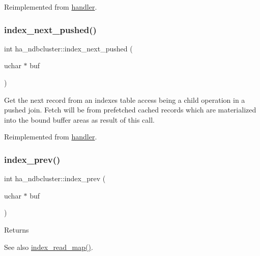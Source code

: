 Reimplemented from \mbox{\hyperlink{classhandler_aca48f687872e10a4fdc35b418d98b761}{handler}}.

\mbox{\label{classha__ndbcluster_a8c12adc1c87097562760e06689e7ec38}} 
\subsubsection{\texorpdfstring{index\+\_\+next\+\_\+pushed()}{index\_next\_pushed()}}
{\footnotesize\ttfamily int ha\+\_\+ndbcluster\+::index\+\_\+next\+\_\+pushed (\begin{DoxyParamCaption}\item[{uchar $\ast$}]{buf }\end{DoxyParamCaption})\hspace{0.3cm}{\ttfamily [virtual]}}

Get the next record from an indexes table access being a child operation in a pushed join. Fetch will be from prefetched cached records which are materialized into the bound buffer areas as result of this call. 

Reimplemented from \mbox{\hyperlink{classhandler}{handler}}.

\mbox{\label{classha__ndbcluster_a824559f84d7f256052f0394e9276774f}} 
\subsubsection{\texorpdfstring{index\+\_\+prev()}{index\_prev()}}
{\footnotesize\ttfamily int ha\+\_\+ndbcluster\+::index\+\_\+prev (\begin{DoxyParamCaption}\item[{uchar $\ast$}]{buf }\end{DoxyParamCaption})\hspace{0.3cm}{\ttfamily [virtual]}}

\begin{DoxyReturn}{Returns}

\end{DoxyReturn}
\begin{DoxySeeAlso}{See also}
\mbox{\hyperlink{classhandler_af8c2b258691e5baac8dd22d19c084b37}{index\+\_\+read\+\_\+map()}}. 
\end{DoxySeeAlso}


